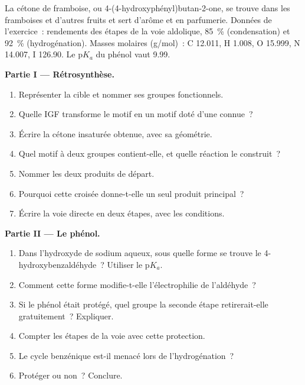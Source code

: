 \begin{problem}
\label{pb:b2:retrosynthesis:1}
La cétone de framboise, ou 4-(4-hydroxyphényl)butan-2-one, se trouve dans les framboises et d'autres
fruits et sert d'arôme et en parfumerie. Données de l'exercice~: rendements des étapes de la voie
aldolique, 85~\% (condensation) et 92~\% (hydrogénation). Masses molaires (\unit{g/mol})~: C 12.011,
H 1.008, O 15.999, N 14.007, I 126.90. Le $\mathrm pK_a$ du phénol vaut 9.99.

\medskip
\noindent\textbf{Partie I --- Rétrosynthèse.}
\begin{enumerate}
  \item Représenter la cible et nommer ses groupes fonctionnels.
  \item Quelle IGF transforme le motif  en un motif doté d'une  connue~?
  \item Écrire la cétone insaturée obtenue, avec sa géométrie.
  \item Quel motif à deux groupes contient-elle, et quelle réaction le construit~?
  \item Nommer les deux produits de départ.
  \item Pourquoi cette  croisée donne-t-elle un seul produit principal~?
  \item Écrire la voie directe en deux étapes, avec les conditions.
\end{enumerate}

\medskip
\noindent\textbf{Partie II --- Le phénol.}
\begin{enumerate}[resume]
  \item Dans l'hydroxyde de sodium aqueux, sous quelle forme se trouve le 4-hydroxybenzaldéhyde~?
        Utiliser le $\mathrm pK_a$.
  \item Comment cette forme modifie-t-elle l'électrophilie de l'aldéhyde~?
  \item Si le phénol était protégé, quel groupe la seconde étape retirerait-elle gratuitement~? Expliquer.
  \item Compter les étapes de la voie avec cette protection.
  \item Le cycle benzénique est-il menacé lors de l'hydrogénation~?
  \item Protéger ou non~? Conclure.
\end{enumerate}


\end{problem}
